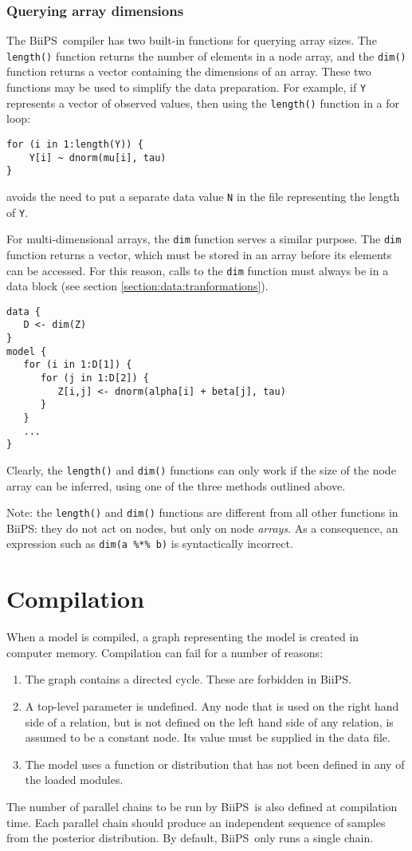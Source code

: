 \documentclass[11pt, a4paper, titlepage]{report}
\newcommand{\biips}{\textsf{BiiPS}}
\begin{document}
\subsubsection*{Querying array dimensions}  

The \biips\ compiler has two built-in functions for querying array
sizes.  The \verb+length()+ function returns the number of elements in
a node array, and the \verb+dim()+ function returns a vector
containing the dimensions of an array.  These two functions may be
used to simplify the data preparation. For example, if \verb+Y+
represents a vector of observed values, then using the \verb+length()+
function in a for loop:
\begin{verbatim}
for (i in 1:length(Y)) {
    Y[i] ~ dnorm(mu[i], tau)
}
\end{verbatim}
avoids the need to put a separate data value \verb+N+ in the file
representing the length of \verb+Y+.  

For multi-dimensional arrays, the \verb+dim+ function serves a similar
purpose. The \verb+dim+ function returns a vector, which must be stored
in an array before its elements can be accessed. For this reason, calls
to the \verb+dim+ function must always be in a data block (see section
\ref{section:data:tranformations}).
\begin{verbatim}
data {
   D <- dim(Z)
}
model {
   for (i in 1:D[1]) {
      for (j in 1:D[2]) {
         Z[i,j] <- dnorm(alpha[i] + beta[j], tau)
      }
   }
   ...
}
\end{verbatim}
Clearly, the \verb+length()+ and \verb+dim()+ functions can only
work if the size of the node array can be inferred, using one of the
three methods outlined above.

Note: the \verb+length()+ and \verb+dim()+ functions are different
from all other functions in \biips: they do not act on nodes, but only
on node {\em arrays}. As a consequence, an expression such as
\verb+dim(a %*% b)+ is syntactically incorrect.

\section{Compilation}

When a model is compiled, a graph representing the model is created in
computer memory. Compilation can fail for a number of reasons:
\begin{enumerate}
\item The graph contains a directed cycle.  These are forbidden
in \biips.
\item A top-level parameter is undefined. Any node that is used on
the right hand side of a relation, but is not defined on the left
hand side of any relation, is assumed to be a constant node. Its value
must be supplied in the data file. 
\item The model uses a function or distribution that has not been
defined in any of the loaded modules.
\end{enumerate}
The number of parallel chains to be run by \biips\ is also defined at
compilation time.  Each parallel chain should produce an independent
sequence of samples from the posterior distribution. By default,
\biips\ only runs a single chain.
\end{document}
